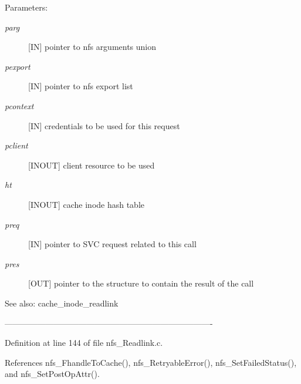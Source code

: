 \begin{Desc}
\item[Parameters:]
\begin{description}
\item[{\em parg}][IN] pointer to nfs arguments union \item[{\em pexport}][IN] pointer to nfs export list \item[{\em pcontext}][IN] credentials to be used for this request \item[{\em pclient}][INOUT] client resource to be used \item[{\em ht}][INOUT] cache inode hash table \item[{\em preq}][IN] pointer to SVC request related to this call \item[{\em pres}][OUT] pointer to the structure to contain the result of the call\end{description}
\end{Desc}
\begin{Desc}
\item[See also:]cache\_\-inode\_\-readlink\end{Desc}
---------------------------------------------------------------------------- 

Definition at line 144 of file nfs\_\-Readlink.c.

References nfs\_\-Fhandle\-To\-Cache(), nfs\_\-Retryable\-Error(), nfs\_\-Set\-Failed\-Status(), and nfs\_\-Set\-Post\-Op\-Attr().